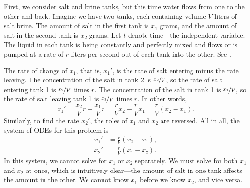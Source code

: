 \begin{example} \label{sintro:closedbrine-example}
First, we consider salt and brine tanks, but this time water flows
from one to the other and back.
Imagine we have two tanks, each containing volume $V$ liters of salt brine.
The amount of salt in the first tank is $x_1$ grams, and the amount of salt
in the second tank is $x_2$ grams.
Let $t$ denote time---the independent variable.
The liquid in each tank is being
constantly and perfectly mixed and
flows or is pumped at a rate of $r$ liters per second out of each tank into the other.
See .

\begin{myfig}
\capstart
{}
\caption{A closed system of two brine tanks.\label{sintro:closedbrine}}
\end{myfig}

The rate of change of $x_1$,
that is, $x_1'$, is the
rate of salt entering minus the rate leaving.
The concentration of the salt in tank 2 is $\nicefrac{x_2}{V}$,
so the rate of salt entering tank 1 is
$\nicefrac{x_2}{V}$ times $r$.
The concentration of the salt in tank 1 is $\nicefrac{x_1}{V}$,
so the rate of salt leaving tank 1 is
$\nicefrac{x_1}{V}$ times $r$.
In other words,
\begin{equation*}
x_1' = \frac{x_2}{V} r - \frac{x_1}{V} r =
\frac{r}{V} x_2 - \frac{r}{V} x_1  = \frac{r}{V} (x_2-x_1).
\end{equation*}
Similarly, to find the rate $x_2'$, the roles of $x_1$ and $x_2$
are reversed.  All in all, the system of ODEs for this problem is
\begin{equation*}
\begin{aligned}
x_1' & = \frac{r}{V} (x_2-x_1), \\
x_2' & = \frac{r}{V} (x_1-x_2).
\end{aligned}
\end{equation*}
In this system, we cannot solve for $x_1$ or $x_2$ separately.  We must
solve for both $x_1$ and $x_2$ at once,
which is intuitively clear---the amount of salt in one tank
affects the amount in the other.
We cannot know $x_1$ before we know $x_2$, and vice versa.


\end{example}
